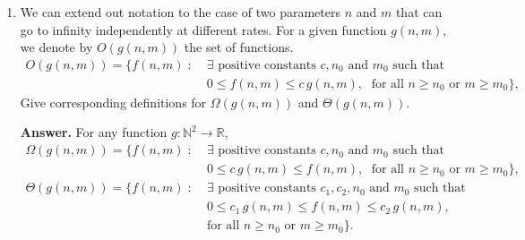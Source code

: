 \documentclass[12pt]{article}
\begin{document}
\begin{enumerate}
    \item We can extend out notation to the case of two parameters \(n\) and \(m\) that can go to infinity independently at different rates. For a given function \(g(n, m)\), we denote by \(O(g(n, m))\) the set of functions.
    \begin{align*}
        O(g(n, m)) = \{ f(n, m) \; : \; & \exists \text{ positive constants } c, n_0 \text{ and } m_0 \text{ such that} \\
        & 0 \leq f(n, m) \leq c \, g(n, m), \; \text{ for all } n \geq n_0 \text{ or } m \geq m_0\},
    \end{align*}
    Give corresponding definitions for \(\Omega(g(n, m))\) and \(\Theta(g(n, m))\).

    \textbf{Answer.}
    For any function \(g : \mathbb{N}^2 \to \mathbb{R}\),
    \begin{align*}
        \Omega(g(n, m)) = \{ f(n, m) \; : \; & \exists \text{ positive constants } c, n_0 \text{ and } m_0 \text{ such that} \\
        & 0 \leq c \, g(n, m) \leq f(n, m), \; \text{ for all } n \geq n_0 \text{ or } m \geq m_0\}, \\
        \Theta(g(n, m)) = \{ f(n, m) \; : \; & \exists \text{ positive constants } c_1, c_2, n_0 \text{ and } m_0 \text{ such that} \\
        & 0 \leq c_1 \, g(n, m) \leq f(n, m) \leq c_2 \, g(n, m), \\
        & \text{for all } n \geq n_0 \text{ or } m \geq m_0\}.
    \end{align*}

\end{enumerate}
\end{document}
